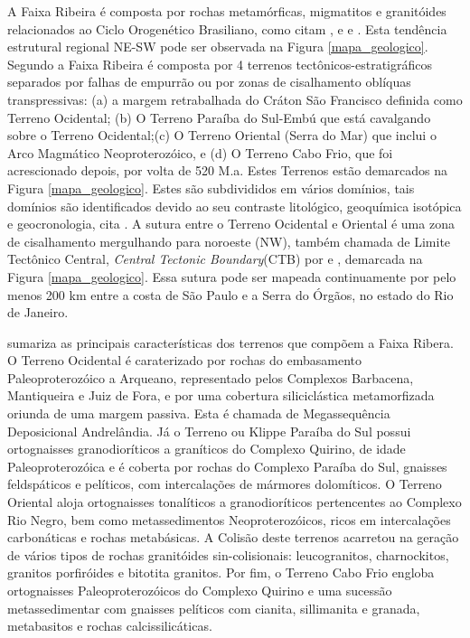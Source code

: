 A Faixa Ribeira é composta por rochas metamórficas, migmatitos e granitóides relacionados ao Ciclo Orogenético Brasiliano, como citam \cite{kuhn_metamorphic_2004}, \cite{heilbron_evolution_2010} e \cite{valeriano_u_pb_2011} e \cite{heilbron_serra_2013}. Esta tendência estrutural regional NE-SW pode ser observada na Figura \ref{mapa_geologico}. Segundo \cite{heilbron_evolution_2010} a Faixa Ribeira é composta por 4 terrenos tectônicos-estratigráficos separados por falhas de empurrão ou por zonas de cisalhamento oblíquas transpressivas: (a) a margem retrabalhada do Cráton São Francisco definida como Terreno Ocidental; (b) O Terreno Paraíba do Sul-Embú que está cavalgando sobre o Terreno Ocidental;(c) O Terreno Oriental (Serra do Mar) que inclui o Arco Magmático Neoproterozóico, e (d) O Terreno Cabo Frio, que foi acrescionado depois, por volta de 520 M.a. Estes Terrenos estão demarcados na Figura \ref{mapa_geologico}. Estes são subdivididos em vários domínios, tais domínios são identificados devido ao seu contraste litológico, geoquímica isotópica e geocronologia, cita \cite{kuhn_metamorphic_2004}. A sutura entre o Terreno Ocidental e Oriental é uma zona de cisalhamento mergulhando para noroeste (NW), também chamada de Limite Tectônico Central, \textit{Central Tectonic Boundary}(CTB) por \cite{heilbron_evolution_2010} e \cite{trouw_new_2013}, demarcada na Figura \ref{mapa_geologico}. Essa sutura pode ser mapeada continuamente por pelo menos 200 km entre a costa de São Paulo e a Serra do Órgãos, no estado do Rio de Janeiro. 

\cite{trouw_new_2013} sumariza as principais características dos terrenos que compõem a Faixa Ribera. O Terreno Ocidental é caraterizado por rochas do embasamento Paleoproterozóico a Arqueano, representado pelos Complexos Barbacena, Mantiqueira e Juiz de Fora, e por uma cobertura siliciclástica metamorfizada oriunda de uma margem passiva. Esta é chamada de Megassequência Deposicional Andrelândia. Já o Terreno ou Klippe Paraíba do Sul possui ortognaisses granodioríticos a graníticos do Complexo Quirino, de idade Paleoproterozóica e é coberta por rochas do Complexo Paraíba do Sul, gnaisses feldspáticos e pelíticos, com intercalações de mármores dolomíticos. O Terreno Oriental aloja ortognaisses tonalíticos a granodioríticos pertencentes ao Complexo Rio Negro, bem como metassedimentos Neoproterozóicos, ricos em intercalações carbonáticas e rochas metabásicas. A Colisão deste terrenos acarretou na geração de vários tipos de rochas granitóides sin-colisionais: leucogranitos, charnockitos, granitos porfiróides e bitotita granitos. Por fim, o Terreno Cabo Frio engloba ortognaisses Paleoproterozóicos do Complexo Quirino e uma sucessão metassedimentar com gnaisses pelíticos com cianita, sillimanita e granada, metabasitos e rochas calcissilicáticas. 

